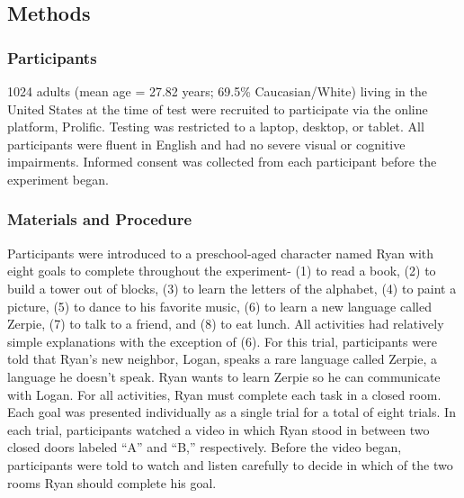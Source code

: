 \documentclass[10pt, letterpaper]{article}
\begin{document}
\hypertarget{methods-2}{%
\subsection{Methods}\label{methods-2}}

\hypertarget{participants-2}{%
\subsubsection{Participants}\label{participants-2}}

1024 adults (mean age = 27.82 years; 69.5\% Caucasian/White) living in
the United States at the time of test were recruited to participate via
the online platform, Prolific. Testing was restricted to a laptop,
desktop, or tablet. All participants were fluent in English and had no
severe visual or cognitive impairments. Informed consent was collected
from each participant before the experiment began.

\hypertarget{materials-and-procedure-2}{%
\subsubsection{Materials and
Procedure}\label{materials-and-procedure-2}}

Participants were introduced to a preschool-aged character named Ryan
with eight goals to complete throughout the experiment- (1) to read a
book, (2) to build a tower out of blocks, (3) to learn the letters of
the alphabet, (4) to paint a picture, (5) to dance to his favorite
music, (6) to learn a new language called Zerpie, (7) to talk to a
friend, and (8) to eat lunch. All activities had relatively simple
explanations with the exception of (6). For this trial, participants
were told that Ryan's new neighbor, Logan, speaks a rare language called
Zerpie, a language he doesn't speak. Ryan wants to learn Zerpie so he
can communicate with Logan. For all activities, Ryan must complete each
task in a closed room. Each goal was presented individually as a single
trial for a total of eight trials. In each trial, participants watched a
video in which Ryan stood in between two closed doors labeled ``A'' and
``B,'' respectively. Before the video began, participants were told to
watch and listen carefully to decide in which of the two rooms Ryan
should complete his goal.
\end{document}
